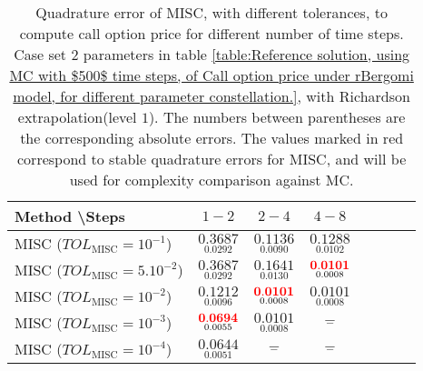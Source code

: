 \begin{table}[h!]
	\centering
	\begin{tabular}{l*{6}{c}r}
		Method \textbackslash  Steps            & $1-2$ & $2-4$ & $4-8$ \\
		\hline
		MISC ($TOL_{\text{MISC}}=10^{-1}$)  & $\underset{ 0.0292}{\mathbf{
				0.3687}}$ & $\underset{ 0.0090}{\mathbf{    0.1136}}$ & $\underset{  0.0102}{\mathbf{  0.1288
		}}$   \\
		MISC ($TOL_{\text{MISC}}=5.10^{-2}$)  & $\underset{ 0.0292}{\mathbf{
				0.3687}}$& $\underset{  0.0130}{\mathbf{
				0.1641
		}}$ & $\underset{0.0008}{\mathbf{{\color{red}0.0101}}}$  \\
		MISC ($TOL_{\text{MISC}}=10^{-2}$)  & $\underset{   0.0096
		}{\mathbf{    0.1212
		}}$ & $\underset{0.0008}{\mathbf{
				{\color{red}0.0101}}}$ & $\underset{0.0008 }{\mathbf{
				0.0101}}$  \\
		MISC ($TOL_{\text{MISC}}=10^{-3}$)  & $\underset{     0.0055
		}{\mathbf{ {\color{red}    0.0694}
		}}$ & $\underset{0.0008}{\mathbf{
				0.0101}}$ & $\underset{-}{\mathbf{-}}$   \\
		
		MISC ($TOL_{\text{MISC}}=10^{-4}$)  & $\underset{  0.0051}{\mathbf{    0.0644		}}$ & $\underset{-}{\mathbf{-}}$ & $\underset{-}{\mathbf{-}}$   \\
		
		\hline
	\end{tabular}
	\caption{Quadrature error of MISC, with different tolerances,   to compute call option price for different number of time steps. Case set $2$ parameters in table \ref{table:Reference solution, using MC with $500$ time steps, of Call option price under rBergomi model, for different parameter constellation.}, with Richardson extrapolation(level $1$). The numbers between parentheses are the corresponding absolute errors. The values marked in red correspond to stable quadrature errors for MISC, and will be used for complexity comparison against MC.}
	\label{Quadrature error of MISC to compute Call option price of the different tolerances for different number of time steps. Case set $2$ parameters, with Richardson extrapolation(level $1$). The numbers between parentheses are the corresponding absolute errors,linear}
\end{table}



